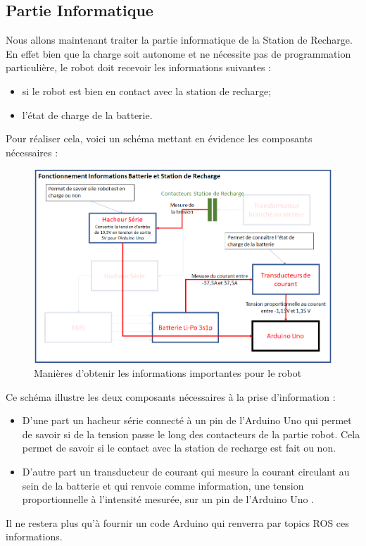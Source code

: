 \documentclass[french]{rapportENSTAB}
\begin{document}
\subsection{Partie Informatique}
Nous allons maintenant traiter la partie informatique de la Station de Recharge. En effet bien que la charge soit autonome et ne nécessite pas de programmation particulière, le robot doit recevoir les informations suivantes : \begin{itemize}[label=\textbullet, font=\small\color{blue}]
    \item si le robot est bien en contact avec la station de recharge;
    \item l'état de charge de la batterie.
\end{itemize}

Pour réaliser cela, voici un schéma mettant en évidence les composants nécessaires : 
\begin{figure}[H]
    \centering
    \includegraphics[scale=0.75]{images/station de recharge/Archi 3.png}
    \caption{Manières d'obtenir les informations importantes pour le robot}
    \label{fig:archi capteur}
\end{figure}

Ce schéma illustre les deux composants nécessaires à la prise d'information :\begin{itemize}[label=\textbullet, font=\small\color{blue}]
    \item D'une part un hacheur série connecté à un pin de l'Arduino Uno qui permet de savoir si de la tension passe le long des contacteurs de la partie robot. Cela permet de savoir si le contact avec la station de recharge est fait ou non.
    \item D'autre part un transducteur de courant qui mesure la courant circulant au sein de la batterie et qui renvoie comme information, une tension proportionnelle à l'intensité mesurée, sur un pin de l'Arduino Uno .
\end{itemize}
Il ne restera plus qu'à fournir un code Arduino qui renverra par topics ROS ces informations.
\end{document}
